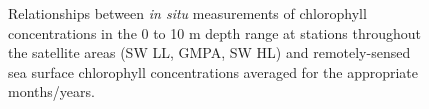 \documentclass[12pt]{article}\usepackage[]{graphicx}\usepackage[]{color}
\begin{document}
\begin{figure}[htb]

{\centering {} 

}

\caption{Relationships between \emph{in situ} measurements of chlorophyll concentrations in the 0 to 10 m depth range at stations throughout the satellite areas (SW LL, GMPA, SW HL) and remotely-sensed sea surface chlorophyll concentrations averaged for the appropriate months/years.}\label{fig:figure28}
\end{figure}
\clearpage
\end{document}
